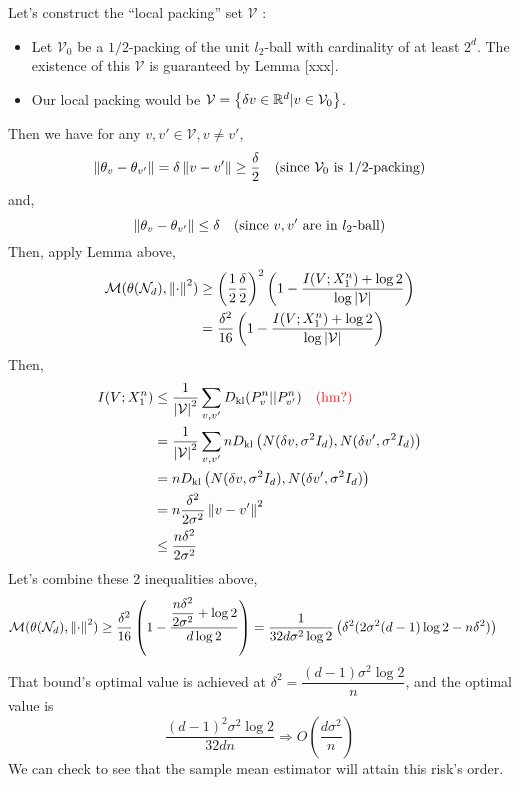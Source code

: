 \documentclass[11pt,a4paper]{article}
\begin{document}
Let's construct the ``local packing'' set $\mathcal{V}$ :
\begin{itemize}
    \item Let $\mathcal{V}_0$ be a $1/2$-packing of the unit $l_2$-ball with cardinality of at least $2^{d}$. The existence of this $\mathcal{V}$ is guaranteed by Lemma [xxx].
    \item Our local packing would be $\mathcal{V} = \left\{\delta v \in \mathbb{R}^{d} | v \in \mathcal{V}_0\right\}$.
\end{itemize}
Then we have for any $v, v' \in \mathcal{V}, v \neq v'$,
\[
\left\lVert\theta_v - \theta_{v'}\right\rVert = \delta \left\lVert v - v'\right\rVert \geq \dfrac{\delta}{2} \quad \text{(since $\mathcal{V}_0$ is $1/2$-packing)}
\] 
and,
\[
\left\lVert\theta_v - \theta_{v'}\right\rVert \leq \delta  \quad \text{(since $v, v'$ are in $l_2$-ball)}
\] 
Then, apply Lemma above,
\begin{align*}
\mathcal{M}(\theta(\mathcal{N}_d), \left\lVert\cdot\right\rVert^2) 
&\geq \left( \dfrac{1}{2} \dfrac{\delta}{2} \right)^2 \left( 1- \dfrac{I(V; X_1^{n}) + \log 2}{\log \left\lvert\mathcal{V}\right\rvert} \right) \\
&= \dfrac{\delta^2}{16} \left( 1- \dfrac{I(V; X_1^{n}) + \log 2}{\log \left\lvert\mathcal{V}\right\rvert} \right)
\end{align*} 
Then, 
\begin{align*}
    I(V; X_1^{n}) 
    &\leq \dfrac{1}{\left\lvert\mathcal{V}\right\rvert^2} \sum_{v, v'}  D_{\rm kl}(P_v^{n} || P_{v'}^{n})  \quad \text{\color{red}(hm?)} \\
    &= \dfrac{1}{\left\lvert\mathcal{V}\right\rvert^2} \sum_{v, v'} n D_{\rm kl}\left( N(\delta v, \sigma^2 I_d), N(\delta v', \sigma^2 I_d) \right) \\
    &= n D_{\rm kl}\left( N(\delta v, \sigma^2 I_d), N(\delta v', \sigma^2 I_d) \right) \\
    &= n \dfrac{\delta^2}{2\sigma^2 } \left\lVert v - v'\right\rVert^2 \\
    &\leq \dfrac{n \delta^2}{2 \sigma^2}
\end{align*}
Let's combine these 2 inequalities above,
\begin{align*}
    \mathcal{M}(\theta(\mathcal{N}_d), \left\lVert\cdot\right\rVert^2) 
    &\geq \dfrac{\delta^2}{16} \left( 1 - \dfrac{\dfrac{n \delta^2}{2 \sigma^2} + \log 2}{d \log 2} \right)
    = \dfrac{1}{32 d \sigma^2 \log 2} \left(  \delta^2 (2 \sigma^2 (d-1) \log 2 - n\delta^2)\right)
\end{align*} 
That bound's optimal value is achieved at $\delta^2 = \dfrac{(d-1)\sigma^2 \log 2}{n}$, and the optimal value is
\[
\dfrac{(d-1)^2 \sigma^2 \log 2}{32 dn} \Rightarrow O\left(  \dfrac{d\sigma^2}{n} \right)
\] 
We can check to see that the sample mean estimator will attain this risk's order.
\end{document}
